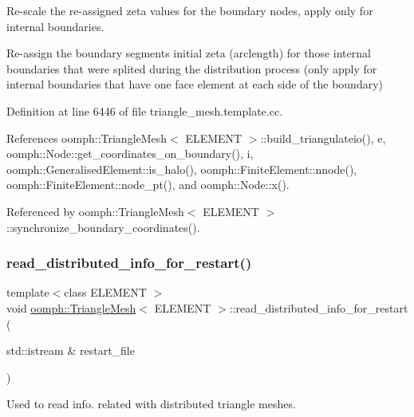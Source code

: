 Re-\/scale the re-\/assigned zeta values for the boundary nodes, apply only for internal boundaries. 

Re-\/assign the boundary segments initial zeta (arclength) for those internal boundaries that were splited during the distribution process (only apply for internal boundaries that have one face element at each side of the boundary) 

Definition at line 6446 of file triangle\+\_\+mesh.\+template.\+cc.



References oomph\+::\+Triangle\+Mesh$<$ E\+L\+E\+M\+E\+N\+T $>$\+::build\+\_\+triangulateio(), e, oomph\+::\+Node\+::get\+\_\+coordinates\+\_\+on\+\_\+boundary(), i, oomph\+::\+Generalised\+Element\+::is\+\_\+halo(), oomph\+::\+Finite\+Element\+::nnode(), oomph\+::\+Finite\+Element\+::node\+\_\+pt(), and oomph\+::\+Node\+::x().



Referenced by oomph\+::\+Triangle\+Mesh$<$ E\+L\+E\+M\+E\+N\+T $>$\+::synchronize\+\_\+boundary\+\_\+coordinates().

\mbox{\label{classoomph_1_1TriangleMesh_ac023e6d962d37d1cc3089b31dc1d4a2a}} 
\subsubsection{\texorpdfstring{read\+\_\+distributed\+\_\+info\+\_\+for\+\_\+restart()}{read\_distributed\_info\_for\_restart()}}
{\footnotesize\ttfamily template$<$class E\+L\+E\+M\+E\+NT $>$ \\
void \hyperlink{classoomph_1_1TriangleMesh}{oomph\+::\+Triangle\+Mesh}$<$ E\+L\+E\+M\+E\+NT $>$\+::read\+\_\+distributed\+\_\+info\+\_\+for\+\_\+restart (\begin{DoxyParamCaption}\item[{std\+::istream \&}]{restart\+\_\+file }\end{DoxyParamCaption})\hspace{0.3cm}{\ttfamily [virtual]}}



Used to read info. related with distributed triangle meshes. 



